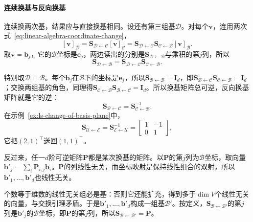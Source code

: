 \paragraph{连续换基与反向换基}
连续换两次基，结果应与直接换基相同。设还有第三组基$\mathcal D$。对每个$\bm v$，连用两次式~\eqref{eq:linear-algebra-coordinate-change}，
\[
 [\bm v]_{\mathcal D}=\bm S_{\mathcal D\leftarrow\mathcal C}[\bm v]_{\mathcal C}=\bm S_{\mathcal D\leftarrow\mathcal C}\bm S_{\mathcal C\leftarrow\mathcal B}[\bm v]_{\mathcal B}.
\]
取$\bm v=\bm b_j$，它的$\mathcal B$坐标是$\bm e_j$，两边读出的分别是$\bm S_{\mathcal D\leftarrow\mathcal B}$与乘积的第$j$列，所以
\[
 \bm S_{\mathcal D\leftarrow\mathcal B}
 =\bm S_{\mathcal D\leftarrow\mathcal C}\bm S_{\mathcal C\leftarrow\mathcal B}.
\]

特别取$\mathcal D=\mathcal B$。每个$\bm b_j$在$\mathcal B$下的坐标是$\bm e_j$，所以$\bm S_{\mathcal B\leftarrow\mathcal B}=\bm I_d$，即$\bm S_{\mathcal B\leftarrow\mathcal C}\bm S_{\mathcal C\leftarrow\mathcal B}=\bm I_d$；交换两组基的角色，同理得$\bm S_{\mathcal C\leftarrow\mathcal B}\bm S_{\mathcal B\leftarrow\mathcal C}=\bm I_d$。所以换基矩阵总可逆，反向换基矩阵就是它的逆：
\[
 \bm S_{\mathcal B\leftarrow\mathcal C}=\bm S_{\mathcal C\leftarrow\mathcal B}^{-1}.
\]
在示例~\ref{ex:ls-change-of-basis-plane}中，
\[
 \bm S_{\mathcal U\leftarrow\mathcal E}=\bm S_{\mathcal E\leftarrow\mathcal U}^{-1}=\begin{bmatrix}1&-1\\0&1\end{bmatrix},
\]
它把$(2,1)^{\top}$送回$(1,1)^{\top}$。

反过来，任一$d$阶可逆矩阵$\bm P$都是某次换基的矩阵。以$\bm P$的第$j$列为$\mathcal B$坐标，取向量$\bm b'_j=\sum_i\bm P_{i,j}\bm b_i$。$\bm P$的列线性无关，而坐标映射是保持线性组合的双射，所以$\bm b'_1,\ldots,\bm b'_d$也线性无关。

个数等于维数的线性无关组必是基：否则它还能扩充，得到多于$\dim V$个线性无关的向量，与交换引理矛盾。于是$\bm b'_1,\ldots,\bm b'_d$构成一组基$\mathcal B'$。按定义，$\bm S_{\mathcal B\leftarrow\mathcal B'}$的第$j$列是$\bm b'_j$的$\mathcal B$坐标，即$\bm P$的第$j$列，所以$\bm S_{\mathcal B\leftarrow\mathcal B'}=\bm P$。

